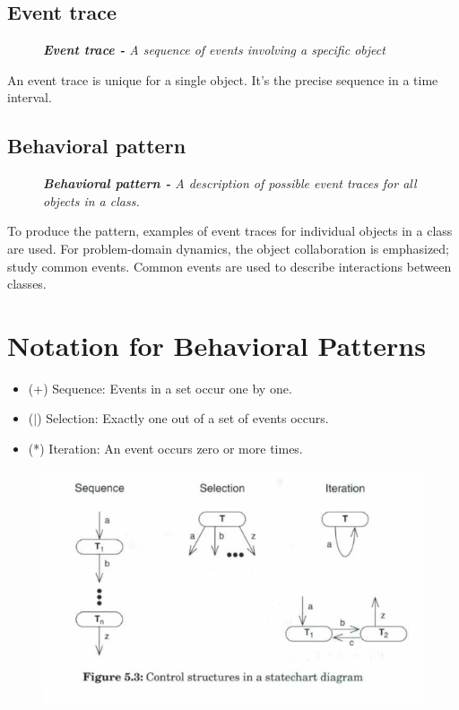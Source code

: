 \subsection*{Event trace \ooad[92]}
\begin{figure}[H]
    \textit{\textbf{Event trace -} A sequence of events involving a specific object}
\end{figure}

An event trace is unique for a single object. It's the precise sequence in a time interval.

\subsection*{Behavioral pattern \ooad[92]}
\begin{figure}[H]
    \textit{\textbf{Behavioral pattern -} A description of possible event traces for all objects in a class.}
\end{figure}
To produce the pattern, examples of event traces for individual objects in a class are used. For problem-domain dynamics, the object collaboration is emphasized; study common events. Common events are used to describe interactions between classes.

\section{Notation for Behavioral Patterns}
\begin{itemize}
    \item (+) Sequence: Events in a set occur one by one.
    \item ($\vert$) Selection: Exactly one out of a set of events occurs.
    \item (*) Iteration: An event occurs zero or more times.
\end{itemize}

\begin{figure}[H]
    \centering
    \includegraphics[width=\linewidth]{parts/2_problem_domain_analysis/behavior/figures/statechart.png}
\end{figure}

